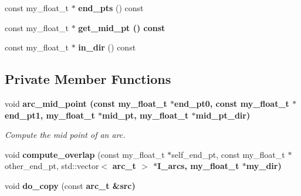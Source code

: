 \begin{CompactItemize}
\item 
const my\_\-float\_\-t $\ast$ \textbf{end\_\-pts} () const \label{classASCbase_1_1geometry_1_1arc__t_1aa54d4a368b5f54286d5b1a2694da6e}

\item 
const my\_\-float\_\-t $\ast$ \bf{get\_\-mid\_\-pt} () const 
\item 
const my\_\-float\_\-t $\ast$ \textbf{in\_\-dir} () const \label{classASCbase_1_1geometry_1_1arc__t_6d0b6a1eaa18fda15db3053be0a6c6f6}

\end{CompactItemize}
\subsection*{Private Member Functions}
\begin{CompactItemize}
\item 
void \bf{arc\_\-mid\_\-point} (const my\_\-float\_\-t $\ast$end\_\-pt0, const my\_\-float\_\-t $\ast$end\_\-pt1, my\_\-float\_\-t $\ast$mid\_\-pt, my\_\-float\_\-t $\ast$mid\_\-pt\_\-dir)\label{classASCbase_1_1geometry_1_1arc__t_bf87d7083d0b036b8aa49a8f76091462}

\begin{CompactList}\small\item\em Compute the mid point of an arc. \item\end{CompactList}\item 
void \textbf{compute\_\-overlap} (const my\_\-float\_\-t $\ast$self\_\-end\_\-pt, const my\_\-float\_\-t $\ast$other\_\-end\_\-pt, std::vector$<$ \bf{arc\_\-t} $>$ $\ast$I\_\-arcs, my\_\-float\_\-t $\ast$my\_\-dir)\label{classASCbase_1_1geometry_1_1arc__t_ec22f353635ed13d58a1f0eacd704ffd}

\item 
void \textbf{do\_\-copy} (const \bf{arc\_\-t} \&src)\label{classASCbase_1_1geometry_1_1arc__t_c999379b32c2d80997fd5cdb3503693f}

\end{CompactItemize}
